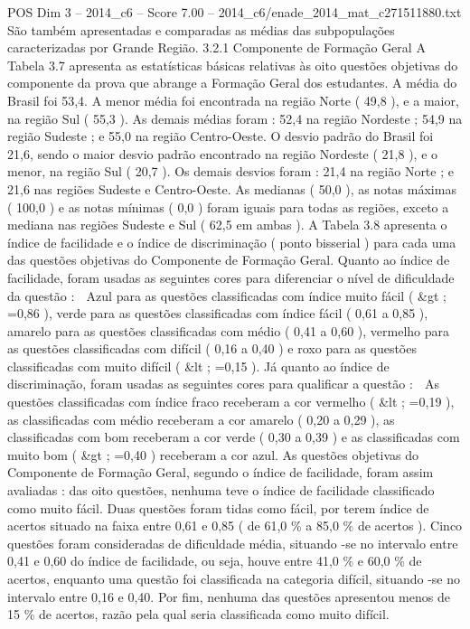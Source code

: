 \begin{textsample}{POS Dim 3 – 2014\_c6 – Score 7.00 – 2014\_c6/enade\_2014\_mat\_c271511880.txt}
São também apresentadas e comparadas as médias das subpopulações caracterizadas por Grande Região. 3.2.1 Componente de Formação Geral A Tabela 3.7 apresenta as estatísticas básicas relativas às oito questões objetivas do componente da prova que abrange a Formação Geral dos estudantes.
A média do Brasil foi 53,4.
A menor média foi encontrada na região Norte ( 49,8 ), e a maior, na região Sul ( 55,3 ).
As demais médias foram : 52,4 na região Nordeste ; 54,9 na região Sudeste ; e 55,0 na região Centro-Oeste.
O desvio padrão do Brasil foi 21,6, sendo o maior desvio padrão encontrado na região Nordeste ( 21,8 ), e o menor, na região Sul ( 20,7 ).
Os demais desvios foram : 21,4 na região Norte ; e 21,6 nas regiões Sudeste e Centro-Oeste.
As medianas ( 50,0 ), as notas máximas ( 100,0 ) e as notas mínimas ( 0,0 ) foram iguais para todas as regiões, exceto a mediana nas regiões Sudeste e Sul ( 62,5 em ambas ).
A Tabela 3.8 apresenta o índice de facilidade e o índice de discriminação ( ponto bisserial ) para cada uma das questões objetivas do Componente de Formação Geral.
Quanto ao índice de facilidade, foram usadas as seguintes cores para diferenciar o nível de dificuldade da questão :  Azul para as questões classificadas com índice muito fácil ( \&gt ; =0,86 ), verde para as questões classificadas com índice fácil ( 0,61 a 0,85 ), amarelo para as questões classificadas com médio ( 0,41 a 0,60 ), vermelho para as questões classificadas com difícil ( 0,16 a 0,40 ) e roxo para as questões classificadas com muito difícil ( \&lt ; =0,15 ).
Já quanto ao índice de discriminação, foram usadas as seguintes cores para qualificar a questão :  As questões classificadas com índice fraco receberam a cor vermelho ( \&lt ; =0,19 ), as classificadas com médio receberam a cor amarelo ( 0,20 a 0,29 ), as classificadas com bom receberam a cor verde ( 0,30 a 0,39 ) e as classificadas com muito bom ( \&gt ; =0,40 ) receberam a cor azul.
As questões objetivas do Componente de Formação Geral, segundo o índice de facilidade, foram assim avaliadas : das oito questões, nenhuma teve o índice de facilidade classificado como muito fácil.
Duas questões foram tidas como fácil, por terem índice de acertos situado na faixa entre 0,61 e 0,85 ( de 61,0 \% a 85,0 \% de acertos ).
Cinco questões foram consideradas de dificuldade média, situando -se no intervalo entre 0,41 e 0,60 do índice de facilidade, ou seja, houve entre 41,0 \% e 60,0 \% de acertos, enquanto uma questão foi classificada na categoria difícil, situando -se no intervalo entre 0,16 e 0,40.
Por fim, nenhuma das questões apresentou menos de 15 \% de acertos, razão pela qual seria classificada como muito difícil.

\end{textsample}
